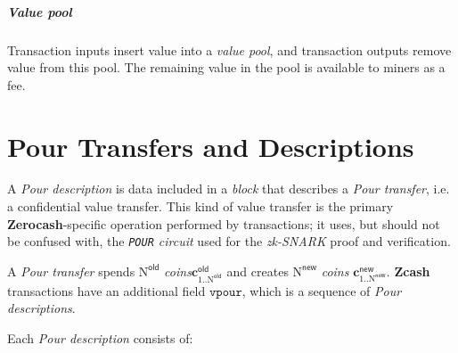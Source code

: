 \documentclass{article}
\newcommand{\term}[1]{\textsl{#1}\xspace}
\newcommand{\termbf}[1]{\textbf{#1}\xspace}
\newcommand{\Zcash}{\termbf{Zcash}}
\newcommand{\Zerocash}{\termbf{Zerocash}}
\newcommand{\coins}{\term{coins}}
\newcommand{\PourDescription}{\term{Pour description}}
\newcommand{\PourDescriptions}{\term{Pour descriptions}}
\newcommand{\PourTransfer}{\term{Pour transfer}}
\newcommand{\block}{\term{block}}
\newcommand{\zkSNARK}{\term{zk-SNARK}}
\newcommand{\vpour}{\mathtt{vpour}}
\newcommand{\NOld}{\mathrm{N}^\mathsf{old}}
\newcommand{\NNew}{\mathrm{N}^\mathsf{new}}
\newcommand{\PourCircuit}{\term{\texttt{POUR} circuit}}
\newcommand{\cOld}[1]{\mathbf{c}_{#1}^\mathsf{old}}
\newcommand{\cNew}[1]{\mathbf{c}_{#1}^\mathsf{new}}
\begin{document}
\subparagraph{Value pool}

Transaction inputs insert value into a \term{value pool}, and transaction outputs 
remove value from this pool. The remaining value in the pool is available to miners 
as a fee.

\section{Pour Transfers and Descriptions}

A \PourDescription is data included in a \block that describes a \PourTransfer,
i.e. a confidential value transfer. This kind of value transfer is the primary
\Zerocash-specific operation performed by transactions; it uses, but should not be
confused with, the \PourCircuit used for the \zkSNARK proof and verification.

A \PourTransfer spends $\NOld$ \coins $\cOld{1..\NOld}$ and creates $\NNew$ \coins
$\cNew{1..\NNew}$. \Zcash transactions have an additional field $\vpour$, which is a
sequence of \PourDescriptions.

Each \PourDescription consists of:
\end{document}
